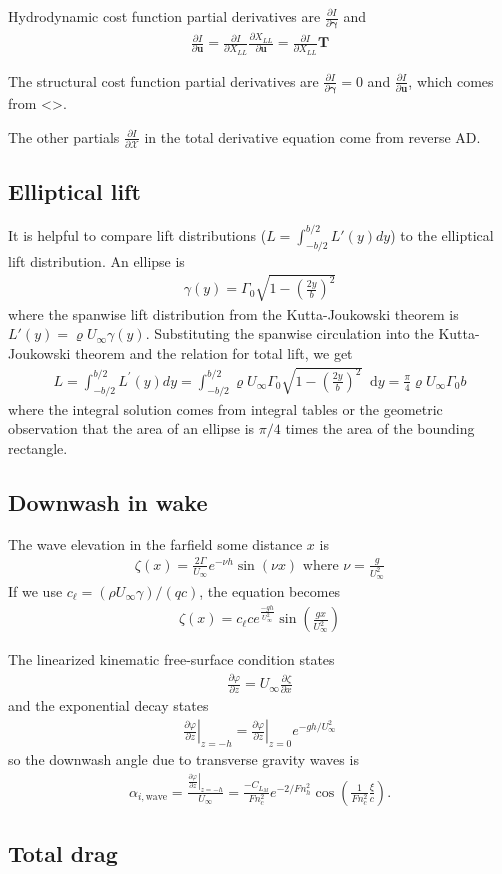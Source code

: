 \documentclass[10pt]{article}
\newcommand{\diff}{\mathop{}\!\tn{d}} %
\newcommand{\pp}[2]{\frac{\partial #1}{\partial #2}}
\newcommand{\mb}[1]{\boldsymbol{\mathbf{#1}}} %
\newcommand{\mcal}[1]{\mathcal{#1}} %
\newcommand{\be}{\begin{eqnarray}}
\newcommand{\ee}{\end{eqnarray}}
\newcommand{\beq}{\begin{equation}\begin{aligned}}
\newcommand{\eeq}{\end{aligned}\end{equation}}
\newcommand{\Uinf}{U_{\infty}}
\newcommand{\tn}[1]{\textrm{#1}}
\begin{document}
Hydrodynamic cost function partial derivatives are $\pp{I}{\mb{\gamma}}$ and
\beq
\pp{I}{\mb{u}} = \pp{I}{X_{LL}}\pp{X_{LL}}{\mb{u}} = \pp{I}{X_{LL}} \mb{T}
\eeq

The structural cost function partial derivatives are $\pp{I}{\mb{\gamma}}=0$ and $\pp{I}{\mb{u}}$, which comes from <>.

The other partials $\pp{I}{\mcal{X}}$ in the total derivative equation come from reverse AD.
\subsection{Elliptical lift}

It is helpful to compare lift distributions ($L = \int_{-b/2}^{b/2}L'(y) dy$) to the elliptical lift distribution.
An ellipse is
\be
\gamma(y)=\Gamma_0 \sqrt{1-\left(\frac{2 y}{b}\right)^2}
\ee
where the spanwise lift distribution from the Kutta-Joukowski theorem is $L'(y) = \varrho \Uinf \gamma(y)$.
Substituting the spanwise circulation into the Kutta-Joukowski theorem and the relation for total lift, we get
\be
L=\int_{-b / 2}^{b / 2} L^{\prime}(y) d y=\int_{-b / 2}^{b / 2} \varrho \Uinf \Gamma_0 \sqrt{1-\left(\frac{2 y}{b}\right)^2} \diff y=\frac{\pi}{4} \varrho \Uinf \Gamma_0 b
\ee
where the integral solution comes from integral tables or the geometric observation that the area of an ellipse is $\pi/4$ times the area of the bounding rectangle.

\subsection{Downwash in wake}
The wave elevation in the farfield some distance $x$ is
\be
\zeta(x) = \frac{2\Gamma}{\Uinf}e^{-\nu h} \sin(\nu x)
\tn{ where }
\nu = \frac{g}{\Uinf^2}
\ee
If we use $c_\ell = (\rho \Uinf \gamma) /\left(q c\right)$, the equation becomes
\be
\zeta(x) = c_\ell c e^{\frac{-gh}{\Uinf^2}} \sin\left(\frac{g x}{\Uinf^2}\right)
\ee

The linearized kinematic free-surface condition states
\be
\label{eqn:KFSBC}
\pp{\varphi}{z} =
\Uinf \pp{\zeta}{x}
\ee
and the exponential decay states
\be
\left. \pp{\varphi}{z} \right|_{z=-h} =
\left. \pp{\varphi}{z} \right|_{z=0} e^{-gh/\Uinf^2}
\ee
so the downwash angle due to transverse gravity waves is
\be
\alpha_{i,\tn{wave}} = \frac{ \left. \pp{\varphi}{z} \right|_{z=-h} }{\Uinf}
=
\frac{
-C_{L_M}
}{Fn_c^2} e^{{-2}/{Fn_h^2}}
\cos\left(
\frac{1}{Fn_c^2}\frac{\xi}{c}
\right).
\ee

\subsection{Total drag}
\end{document}
